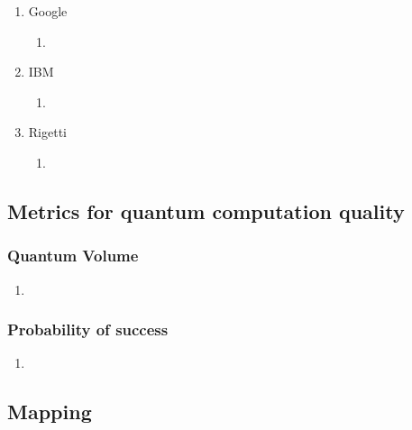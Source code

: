 \documentclass[11pt]{article}
\begin{document}
\begin{enumerate}
\item Google
\label{sec:org236b6ba}

\begin{enumerate}
\item \cite{boixo16:charac_quant_suprem_near_term_devic}
\label{sec:org75b8138}
\end{enumerate}

\item IBM
\label{sec:orga015bdc}

\begin{enumerate}
\item \cite{IBM_QX}
\label{sec:orgc847fc0}
\end{enumerate}

\item Rigetti
\label{sec:orgdea758f}

\begin{enumerate}
\item \cite{Sete_2016}
\label{sec:org4aaa503}
\end{enumerate}
\end{enumerate}

\subsection{Metrics for quantum computation quality}
\label{sec:org3741c56}

\subsubsection{Quantum Volume}
\label{sec:orgb705e5a}

\begin{enumerate}
\item \cite{Moll_2018}
\label{sec:org96db8d8}
\end{enumerate}

\subsubsection{Probability of success}
\label{sec:org187d032}

\begin{enumerate}
\item \cite{Linke_2017}
\label{sec:org92df166}
\end{enumerate}

\subsection{Mapping}
\label{sec:org5053325}
\end{document}
